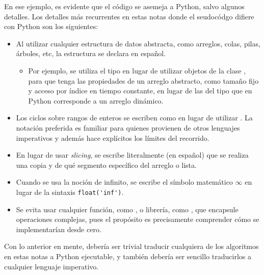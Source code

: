 En ese ejemplo, es evidente que el código se asemeja a Python, salvo algunos detalles. Los detalles más recurrentes en estas notas donde el seudocódgo difiere con Python son los siguientes:
\begin{itemize}
  \item Al utilizar cualquier estructura de datos abstracta, como arreglos, colas, pilas, árboles, etc, la estructura se declara en español.
  \begin{itemize}
    \item Por ejemplo, se utiliza el tipo  en lugar de utilizar objetos de la clase , para que tenga las propiedades de un arreglo abstracto, como tamaño fijo y acceso por índice en tiempo constante, en lugar de las del tipo  que en Python corresponde a un arreglo dinámico.
  \end{itemize}
  \item Los ciclos sobre rangos de enteros se escriben como  en lugar de utilizar . La notación preferida es familiar para quienes provienen de otros lenguajes imperativos y además hace explícitos los límites del recorrido.
  \item En lugar de usar \textit{slicing}, se escribe literalmente (en español) que se realiza una copia y de qué segmento específico del arreglo o lista.
  \item Cuando se usa la noción de infinito, se escribe el símbolo matemático \(\infty\) en lugar de la sintaxis \verb|float('inf')|.
  \item Se evita usar cualquier función, como , o librería, como , que encapsule operaciones complejas, pues el propósito es precisamente comprender cómo se implementarían desde cero.
\end{itemize}
Con lo anterior en mente, debería ser trivial traducir cualquiera de los algoritmos en estas notas a Python ejecutable, y también debería ser sencillo traducirlos a cualquier lenguaje imperativo.